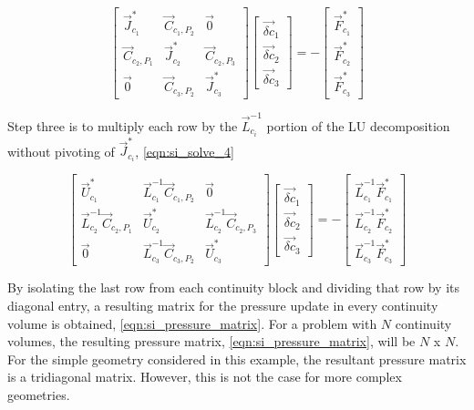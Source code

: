   \begin{equation}
 \label{eqn:si_solve_3}
 \begin{bmatrix} 
 \vec{J}^{*}_{c_1} & \vec{C}_{c_1,P_2} & \vec{0} \\
 \vec{C}_{c_2,P_1} & \vec{J}^{*}_{c_2} & \vec{C}_{c_2,P_3} \\
 \vec{0}           & \vec{C}_{c_3,P_2} & \vec{J}^{*}_{c_3}
 \end{bmatrix} \begin{bmatrix}
 \vec{\delta c}_{1} \\
 \vec{\delta c}_{2} \\
 \vec{\delta c}_{3}
\end{bmatrix}  = -\begin{bmatrix}
 \vec{F}^{*}_{c_1} \\
 \vec{F}^{*}_{c_2} \\
 \vec{F}^{*}_{c_3}
\end{bmatrix}
 \end{equation}

Step three is to multiply each row by the $\vec{L}^{-1}_{c_i}$ portion of the LU decomposition without pivoting of $\vec{J}^{*}_{c_i}$, \eqref{eqn:si_solve_4}

  \begin{equation}
 \label{eqn:si_solve_4}
 \begin{bmatrix} 
 \vec{U}^{*}_{c_1} & \vec{L}^{-1}_{c_1}\vec{C}_{c_1,P_2} & \vec{0} \\
 \vec{L}^{-1}_{c_2}\vec{C}_{c_2,P_1} & \vec{U}^{*}_{c_2} & \vec{L}^{-1}_{c_2}\vec{C}_{c_2,P_3} \\
 \vec{0}           & \vec{L}^{-1}_{c_3}\vec{C}_{c_3,P_2} & \vec{U}^{*}_{c_3}
 \end{bmatrix} \begin{bmatrix}
 \vec{\delta c}_{1} \\
 \vec{\delta c}_{2} \\
 \vec{\delta c}_{3}
\end{bmatrix}  = -\begin{bmatrix}
 \vec{L}^{-1}_{c_1}\vec{F}^{*}_{c_1} \\
 \vec{L}^{-1}_{c_2}\vec{F}^{*}_{c_2} \\
 \vec{L}^{-1}_{c_3}\vec{F}^{*}_{c_3}
\end{bmatrix}
 \end{equation}
 
By isolating the last row from each continuity block and dividing that row by its diagonal entry, a resulting matrix for the pressure update in every continuity volume is obtained, \eqref{eqn:si_pressure_matrix}. 
For a problem with $N$ continuity volumes, the resulting pressure matrix, \eqref{eqn:si_pressure_matrix}, will be $N$ x $N$.
For the simple geometry considered in this example, the resultant pressure matrix is a tridiagonal matrix.
However, this is not the case for more complex geometries.


